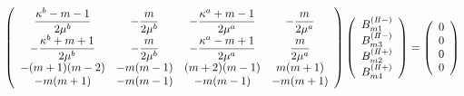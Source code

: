 \begin{align}
	\left(
	\begin{array}{cccc}
		{\displaystyle\frac{ \kappa^b-m-1}{2\mu^{b}}}& {\displaystyle-\frac{m}{2\mu^{b}}} &
		{\displaystyle-\frac{\kappa^a+m-1}{2\mu^{a}}} & {\displaystyle-\frac{m}{2\mu^{a}}} \\
		{\displaystyle-\frac{\kappa^b+m+1}{2\mu^{b}}} & {\displaystyle-\frac{m}{2\mu^{b}}} &
		{\displaystyle-\frac{\kappa^a-m+1}{2\mu^{a}}} & {\displaystyle \frac{m}{2\mu^{a}}} \\
		-(m+1)(m-2) & -m(m-1) & (m+2)(m-1) & m(m+1) \\
		-m(m+1) & -m(m-1) & -m(m-1) & -m(m+1)\\
	\end{array}
	\right)
	\left(
	\begin{array}{c}
		B_{m1}^{(I\hspace{-.15em}I-)} \\
	 	B_{m3}^{(I\hspace{-.15em}I-)} \\
		B_{m2}^{(I\hspace{-.15em}I+)}\\
	 	B_{m4}^{(I\hspace{-.15em}I+)} \\
	\end{array}
	\right)
	=
	\left(
	\begin{array}{c}
		0 \\
	 	0 \\
		0 \\
	 	0 \\
	\end{array}
	\right)
\end{align}

